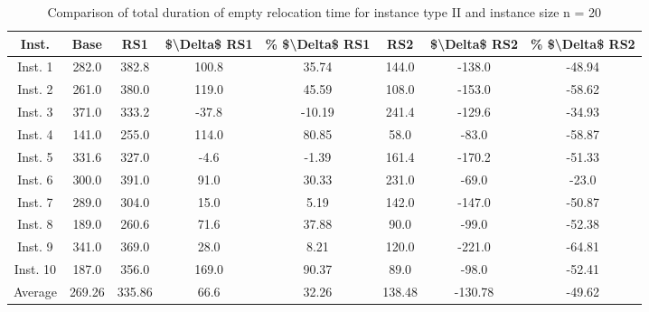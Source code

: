 \begin{table}[H]
\centering
\begin{tabular}{cccccccc}
  \hline
  \textbf{Inst.} & \textbf{Base} & \textbf{RS1} & \textbf{\$\textbackslash{}Delta\$  RS1} & \textbf{\% \$\textbackslash{}Delta\$  RS1} & \textbf{RS2} & \textbf{\$\textbackslash{}Delta\$  RS2} & \textbf{\% \$\textbackslash{}Delta\$  RS2} \\\hline
  Inst. 1 & 282.0 & 382.8 & 100.8 & 35.74 & 144.0 & -138.0 & -48.94 \\
  Inst. 2 & 261.0 & 380.0 & 119.0 & 45.59 & 108.0 & -153.0 & -58.62 \\
  Inst. 3 & 371.0 & 333.2 & -37.8 & -10.19 & 241.4 & -129.6 & -34.93 \\
  Inst. 4 & 141.0 & 255.0 & 114.0 & 80.85 & 58.0 & -83.0 & -58.87 \\
  Inst. 5 & 331.6 & 327.0 & -4.6 & -1.39 & 161.4 & -170.2 & -51.33 \\
  Inst. 6 & 300.0 & 391.0 & 91.0 & 30.33 & 231.0 & -69.0 & -23.0 \\
  Inst. 7 & 289.0 & 304.0 & 15.0 & 5.19 & 142.0 & -147.0 & -50.87 \\
  Inst. 8 & 189.0 & 260.6 & 71.6 & 37.88 & 90.0 & -99.0 & -52.38 \\
  Inst. 9 & 341.0 & 369.0 & 28.0 & 8.21 & 120.0 & -221.0 & -64.81 \\
  Inst. 10 & 187.0 & 356.0 & 169.0 & 90.37 & 89.0 & -98.0 & -52.41 \\
  Average & 269.26 & 335.86 & 66.6 & 32.26 & 138.48 & -130.78 & -49.62 \\\hline
\end{tabular}
\caption{Comparison of total duration of empty relocation time for instance type II and instance size n = 20}
\label{tab:wait:resrelocation-empty-relocation-comparison_II_20}
\end{table}
